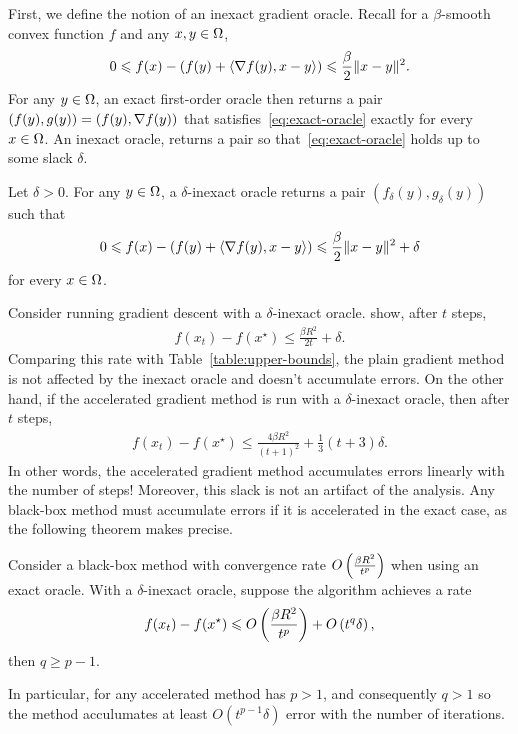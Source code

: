 First, we define the notion of an inexact gradient oracle. Recall for a
$\beta$-smooth convex function $f$ and any $x, y \in \Omega$,
\begin{align}
    0 \leqslant f(x)  - \left(f(y) + \langle \nabla f(y), x - y \rangle \right )
    \leqslant \frac{\beta}{2} \lVert x-y\rVert^2. \label{eq:exact-oracle}
\end{align}
For any $y \in \Omega$, an exact first-order oracle then returns a pair
$(f(y), g(y)) = (f(y), \nabla f(y))$ that satisfies~\eqref{eq:exact-oracle}
exactly for every $x \in \Omega$. 
An inexact oracle, returns a pair so that~\eqref{eq:exact-oracle} holds up to some
slack $\delta$.
~
\begin{definition}
Let $\delta > 0$. For any $y\in \Omega$, a $\delta$-inexact oracle returns a pair
$(f_\delta(y), g_\delta(y))$ such that
\begin{align*}
    0 \leqslant f(x)  - \left(f(y) + \langle \nabla f(y), x - y \rangle \right )
    \leqslant \frac{\beta}{2} \lVert x-y\rVert^2 + \delta
\end{align*}
for every $x \in \Omega$.
\end{definition}
Consider running gradient descent with a $\delta$-inexact oracle.
\cite{devolder2014first}
show, after $t$ steps,
\begin{align*}
    f(x_t) - f(x^\star) \leq \frac{\beta R^2}{2t} + \delta.
\end{align*}
Comparing this rate with Table~\eqref{table:upper-bounds}, the plain gradient
method is not affected by the inexact oracle and doesn't accumulate errors. 
On the other hand, if the accelerated gradient
method is run with a $\delta$-inexact oracle, then after $t$ steps,
\begin{align*}
    f(x_t) - f(x^\star)  \leq \frac{4 \beta R^2}{(t+1)^2} +
    \frac{1}{3}(t+3)\delta.
\end{align*}
In other words, the accelerated gradient method accumulates errors linearly with
the number of steps! Moreover, this slack is not an artifact of the analysis.
Any black-box method must accumulate errors if it is accelerated in the exact
case, as the following theorem makes precise.
\begin{theorem}
Consider a black-box method with convergence rate $O\left(\frac{\beta R^2}{t^p} \right )$
when using an exact oracle. With a $\delta$-inexact oracle, suppose the
algorithm achieves a rate
\begin{align}
    f(x_t) - f(x^\star) \leqslant O\left(\frac{\beta R^2}{t^p} \right ) + O\left(t^q \delta \right ),
\end{align}
then $q \geq p-1$.
\end{theorem}
In particular, for any accelerated method has $p > 1$, and consequently $q > 1$
so the method acculumates at least $O(t^{p-1} \delta)$ error with the number of
iterations. 


